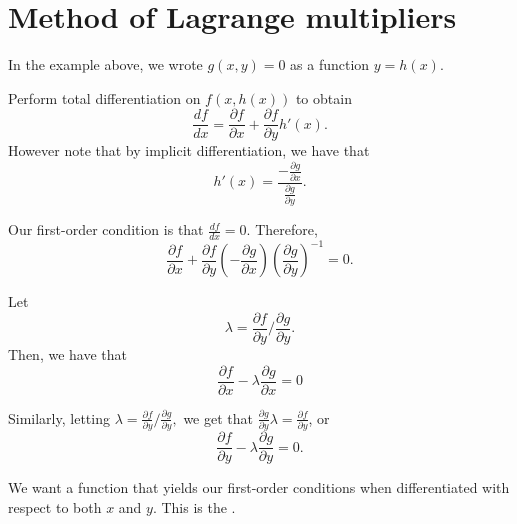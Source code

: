 \documentclass[a4paper, 12pt,oneside,openany]{book}
\begin{document}
\section{Method of Lagrange multipliers}

In the example above, we wrote $g(x, y)=0$ as a function $y=h(x)$. 

Perform total differentiation on $f(x, h(x))$ to obtain $$\frac{df}{dx} = \frac{\partial f}{\partial x} + \frac{\partial f}{\partial y} h'(x).$$ However note that by implicit differentiation, we have that $$h'(x) = \frac{-\frac{\partial g}{\partial x}}{\frac{\partial g}{\partial y}}.$$

Our first-order condition is that $\frac{df}{dx}=0$. Therefore, $$\frac{\partial f}{\partial x}+\frac{\partial f}{\partial y}\left(-\frac{\partial g}{\partial x}\right)\left(\frac{\partial g}{\partial y}\right)^{-1}=0.$$

Let $$\lambda = \frac{\partial f}{\partial y} / \frac{\partial g}{\partial y}.$$ Then, we have that $$\frac{\partial f}{\partial x}-\lambda \frac{\partial g}{\partial x}=0$$

Similarly, letting $\lambda = \frac{\partial f}{\partial y} / \frac{\partial g}{\partial y},$ we get that $\frac{\partial g}{\partial y} \lambda = \frac{\partial f}{\partial y}$, or $$ \frac{\partial f}{\partial y} - \lambda  \frac{\partial g}{\partial y} =0. $$

 We want a function that yields our first-order conditions when differentiated with respect to both $x$ and $y$. This is the . 
\end{document}
